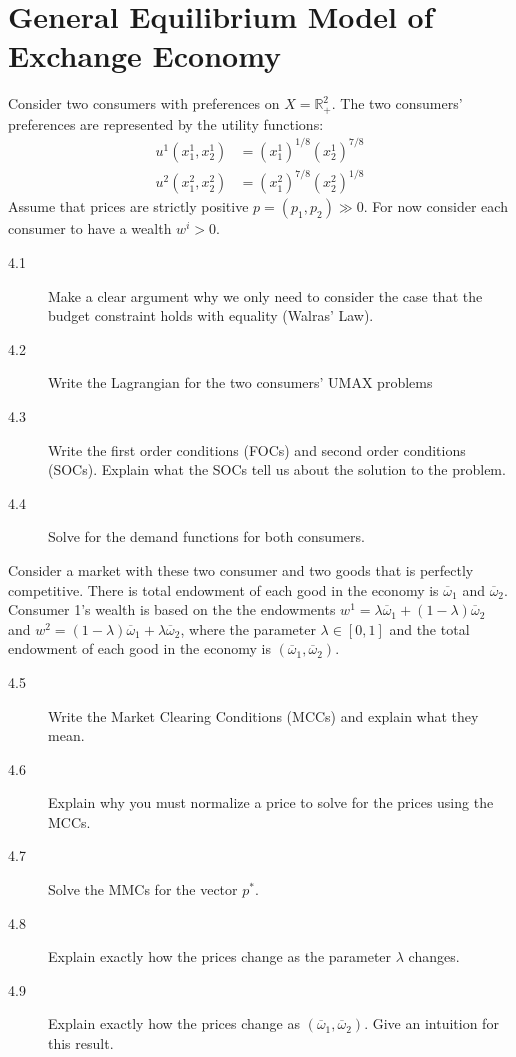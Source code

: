 \documentclass[11pt]{article}
\newcommand{\bw}{\overline{\omega}}
\begin{document}
\section{General Equilibrium Model of Exchange Economy}

\noindent Consider two consumers with preferences on $X=\mathbb{R}^2_+$. The two consumers' preferences are represented by the utility functions:
\begin{align*}
u^1(x_1^1,x_2^1) &= \left(x_1^1\right)^{1/8}\left(x_2^1\right)^{7/8}\\
u^2(x_1^2,x_2^2) &= \left(x_1^2\right)^{7/8}\left(x_2^2\right)^{1/8}
\end{align*}
Assume that prices are strictly positive $p=(p_1,p_2)\gg 0$. For now consider each consumer to have a wealth $w^i>0$.

\begin{description}
\item[4.1] Make a clear argument why we only need to consider the case that the budget constraint holds with equality (Walras' Law).
\item[4.2] Write the Lagrangian for the two consumers' UMAX problems
\item[4.3] Write the first order conditions (FOCs) and second order conditions (SOCs). Explain what the SOCs tell us about the solution to the problem.
\item[4.4] Solve for the demand functions for both consumers.
\end{description}

\newpage
Consider a market with these two consumer and two goods that is perfectly competitive. There is total endowment of each good in the economy is $\bw_1$ and $\bw_2$. Consumer 1's wealth is based on the the endowments $w^1=\lambda\bw_1+(1-\lambda)\bw_2$ and $w^2=(1-\lambda)\bw_1+\lambda\bw_2$, where the parameter $\lambda\in[0,1]$ and the total endowment of each good in the economy is $(\bw_1,\bw_2)$.

\begin{description}
\item[4.5] Write the Market Clearing Conditions (MCCs) and explain what they mean.
\item[4.6] Explain why you must normalize a price to solve for the prices using the MCCs.
\item[4.7] Solve the MMCs for the vector $p^*$.
\item[4.8] Explain exactly how the prices change as the parameter $\lambda$ changes.
\item[4.9] Explain exactly how the prices change as $(\bw_1,\bw_2)$. Give an intuition for this result.
\end{description}
\end{document}
